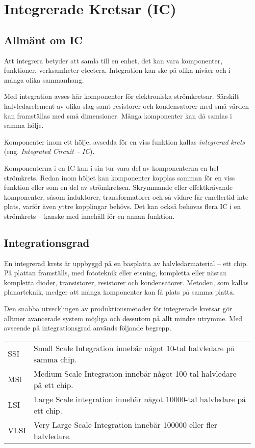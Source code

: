 \section{Integrerade Kretsar (IC)}

\subsection{Allmänt om IC}

Att integrera betyder att samla till en enhet, det kan vara komponenter,
funktioner, verksamheter etcetera.
Integration kan ske på olika nivåer och i många olika sammanhang.

Med integration avses här komponenter för elektroniska strömkretsar. Särskilt
halvledarelement av olika slag samt resistorer och kondensatorer med små värden
kan framställas med små dimensioner. Många komponenter kan då samlas i samma
hölje.

Komponenter inom ett hölje, avsedda för en viss funktion kallas
\emph{integrerad krets} (eng. \emph{Integrated Circuit -- IC}).

Komponenterna i en IC kan i sin tur vara del av komponenterna en hel strömkrets.
Redan inom höljet kan komponenter kopplas samman för en viss funktion eller som
en del av strömkretsen. Skrymmande eller effektkrävande komponenter, såsom
induktorer, transformatorer och så vidare får emellertid inte plats, varför även yttre
kopplingar behövs. Det kan också behövas flera IC i en strömkrets -- kanske med
innehåll för en annan funktion.

\subsection{Integrationsgrad}

En integrerad krets är uppbyggd på en basplatta av halvledarmaterial --
ett chip.
På plattan framställs, med fototeknik eller etsning, kompletta eller nästan
kompletta dioder, transistorer, resistorer och kondensatorer. Metoden, som
kallas planarteknik, medger att många komponenter kan få plats på samma platta.

Den snabba utvecklingen av produktionsmetoder för integrerade kretsar gör
alltmer avancerade system möjliga och dessutom på allt mindre utrymme. Med
avseende på integrationsgrad används följande begrepp.

\begin{tabular}{lp{6cm}}
SSI & Small Scale Integration innebär något 10-tal halvledare på samma chip. \\
MSI & Medium Scale Integration innebär något 100-tal halvledare på ett chip. \\
LSI & Large Scale integration innebär något 10000-tal halvledare på ett chip. \\
VLSI & Very Large Scale Integration innebär 100000 eller fler halvledare. \\
\end{tabular}


